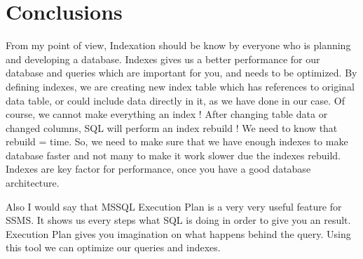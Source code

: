\section*{Conclusions}

From my point of view, Indexation should be know by everyone who is planning and developing a database. Indexes gives us a better performance for our database and queries which are important for you, and needs to be optimized. By defining indexes, we are creating new index table which has references to original data table, or could include data directly in it, as we have done in our case. Of course, we cannot make everything an index ! After changing table data or changed columns, SQL will perform an index rebuild ! We need to know that rebuild = time. So, we need to make sure that we have enough indexes to make database faster and not many to make it work slower due the indexes rebuild. Indexes are key factor for performance, once you have a good database architecture. 


Also I would say that MSSQL Execution Plan is a very very useful feature for SSMS. It shows us every steps what SQL is doing in order to give you an result. Execution Plan gives you imagination on what happens behind the query. Using this tool we can optimize our queries and indexes. 

\clearpage